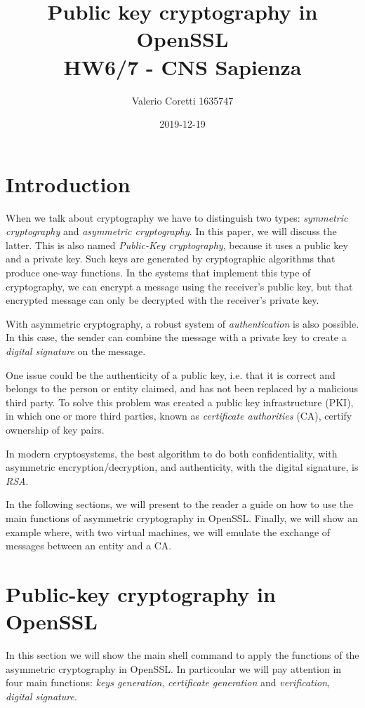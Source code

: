 \documentclass[11pt]{article}
\title{{\bf Public key cryptography in OpenSSL} \\ \bigskip \large HW6/7 - CNS Sapienza}
\date{2019-12-19}
\author{Valerio Coretti 1635747}
\begin{document}
\maketitle

\section{Introduction}
When we talk about cryptography we have to distinguish two types: {\em symmetric cryptography} and {\em asymmetric cryptography}. In this paper, we will discuss the latter. This is also named {\em Public-Key cryptography}, because it uses a public key and a private key. Such keys are generated by cryptographic algorithms that produce one-way functions. In the systems that implement this type of cryptography, we can encrypt a message using the receiver's public key, but that encrypted message can only be decrypted with the receiver's private key.

With asymmetric cryptography, a robust system of {\em authentication} is also possible. In this case, the sender can combine the message with a private key to create a {\em digital signature} on the message.

One issue could be the authenticity of a public key, i.e. that it is correct and belongs to the person or entity claimed, and has not been replaced by a malicious third party.
To solve this problem was created a public key infrastructure (PKI), in which one or more third parties, known as {\em certificate authorities} (CA), certify ownership of key pairs.

In modern cryptosystems, the best algorithm to do both confidentiality, with asymmetric encryption/decryption, and authenticity, with the digital signature, is {\em RSA}.

In the following sections, we will present to the reader a guide on how to use the main functions of asymmetric cryptography in OpenSSL. Finally, we will show an example where, with two virtual machines, we will emulate the exchange of messages between an entity and a CA.

\section{Public-key cryptography in OpenSSL}
In this section we will show the main shell command to apply the functions of the asymmetric cryptography in OpenSSL. In particoular we will pay attention in four main functions:
{\em keys generation}, {\em certificate generation} and {\em verification}, {\em digital signature}.
\end{document}
